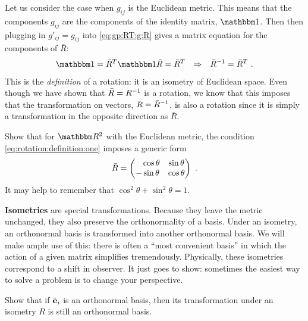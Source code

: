 \documentclass[12pt]{article}
\begin{document}
Let us consider the case when $g_{ij}$ is the Euclidean metric. This means that the components $g_{ij}$ are the components of the identity matrix, $\one$. Then then plugging in $g'_{ij} = g_{ij}$ into \eqref{eq:gp:RT:g:R} gives a matrix equation for the components of $\bar R$:
\begin{align}
    \one &= \bar R^T \one \bar R = \bar R^T 
    &\Rightarrow
    &&
    {\bar R}\inv = {\bar R}^T
    \ .
    \label{eq:rotation:definition:one}
\end{align}
This is the \emph{definition} of a rotation: it is an isometry of Euclidean space. Even though we have shown that $\bar R = R^{-1}$ is a rotation, we know that this imposes that the transformation on vectors, $R = \bar R^{-1}$, is also a rotation since it is simply a transformation in the opposite direction as $\bar R$.
\begin{exercise}
Show that for $\RR^2$ with the Euclidean metric, the condition \eqref{eq:rotation:definition:one} imposes a generic form
\begin{align}
    \bar R = 
    \begin{pmatrix}
        \pp \cos\theta & \sin\theta\\
        - \sin\theta & \cos\theta  
    \end{pmatrix}
    \ .
\end{align}
It may help to remember that $\cos^2\theta + \sin^2\theta = 1$.
\end{exercise}


\textbf{Isometries} are special transformations. Because they leave the metric unchanged, they also preserve the orthonormality of a basis. Under an isometry, an orthonormal basis is transformed into another orthonormal basis. We will make ample use of this: there is often a ``most convenient basis'' in which the action of a given matrix simplifies tremendously. Physically, these isometries correspond to a shift in observer. It just goes to show: sometimes the easiest way to solve a problem is to change your perspective.
\begin{exercise}
Show that if  $\hat{\mathbf{e}}_i$ is an orthonormal basis, then its transformation under an isometry $R$ is still an orthonormal basis.
\end{exercise}
\end{document}
